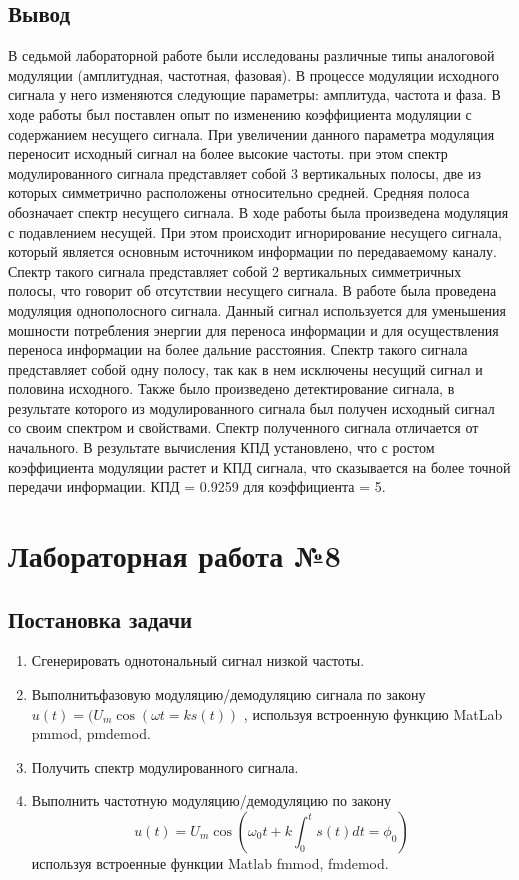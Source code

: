 \documentclass[10pt,a4paper]{report}
\begin{document}
\section{Вывод}
В седьмой лабораторной работе были исследованы различные типы аналоговой модуляции (амплитудная, частотная, фазовая). В процессе модуляции исходного сигнала у него 
изменяются следующие параметры: амплитуда, частота и фаза. В ходе работы был поставлен опыт по изменению коэффициента модуляции с содержанием несущего сигнала.
При увеличении данного параметра модуляция переносит исходный сигнал на более высокие частоты. при этом спектр модулированного сигнала представляет собой 3 вертикальных полосы, 
две из которых симметрично расположены относительно средней. Средняя полоса обозначает спектр несущего сигнала. В ходе работы была произведена модуляция с подавлением несущей.
При этом происходит игнорирование несущего сигнала, который является основным источником информации по передаваемому каналу. Спектр такого сигнала представляет собой 2 вертикальных
 симметричных полосы, что говорит об отсутствии несущего сигнала. В работе была проведена модуляция однополосного сигнала. Данный сигнал используется для уменьшения мошности 
потребления энергии для переноса информации и для осуществления переноса информации на более дальние расстояния. Спектр такого сигнала представляет собой одну полосу,
так как в нем исключены несущий сигнал и половина исходного. Также было произведено детектирование сигнала, в результате которого из модулированного сигнала был получен исходный сигнал
со своим спектром и свойствами. Спектр полученного сигнала отличается от начального. В результате вычисления КПД установлено, что с ростом коэффициента модуляции 
растет и КПД сигнала, что сказывается на более точной передачи информации.
КПД = 0.9259 для коэффициента = 5.
\chapter{Лабораторная работа №8}
\section{Постановка задачи}
\begin{enumerate}
\item 
Сгенерировать однотональный сигнал низкой частоты.
\item
Выполнитьфазовую модуляцию/демодуляцию сигнала по закону $u(t)=(U_m\cos(\omega t=ks(t))$ , используя встроенную функцию MatLab pmmod, pmdemod.
\item
Получить спектр модулированного сигнала.
\item
Выполнить частотную модуляцию/демодуляцию по закону 
\begin{equation}
u(t)=U_m\cos (\omega _0 t+k \int_0^t s(t)dt=\phi _0)
\end{equation}
используя встроенные функции Matlab fmmod, fmdemod.
\end{enumerate}
\end{document}
